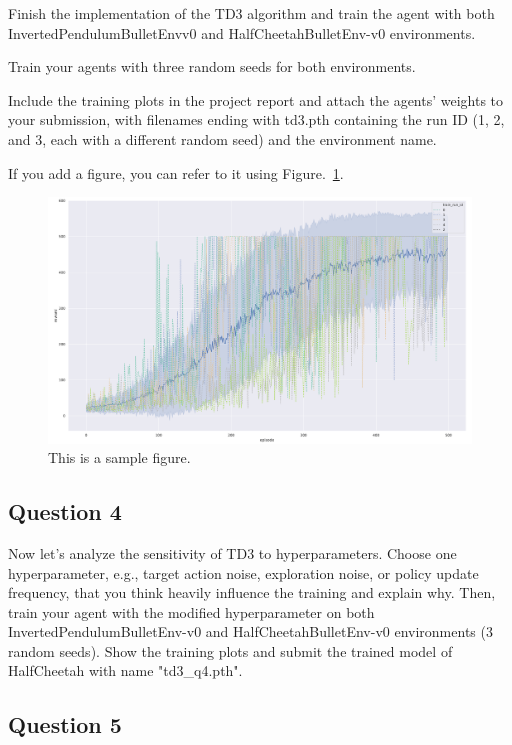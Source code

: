 \documentclass[12pt]{article}
\begin{document}
Finish the implementation of the TD3 algorithm and train the agent with both InvertedPendulumBulletEnvv0 and HalfCheetahBulletEnv-v0 environments.
\newline

\noindent
Train your agents with three random seeds for both environments. 
\newline

\noindent
Include the training plots in the project report and attach the agents’ weights to your submission, with filenames ending with td3.pth containing the run ID
(1, 2, and 3, each with a different random seed) and the environment name.
\newline

\noindent
If you add a figure, you can refer to it using Figure.~\ref*{fig:fig1}.

\begin{figure}[h] 
	\centering  %
    \includegraphics[width=0.9\columnwidth]{img/training.pdf}
	\caption{This is a sample figure.}
	\label{fig:fig1}
\end{figure}

\subsection*{Question 4}

Now let’s analyze the sensitivity of TD3 to hyperparameters. Choose one hyperparameter, e.g.,
target action noise, exploration noise, or policy update frequency, that you think heavily influence the training and explain why. Then, train your agent with the modified hyperparameter on both InvertedPendulumBulletEnv-v0 and HalfCheetahBulletEnv-v0 environments (3 random seeds).
Show the training plots and submit the trained model of HalfCheetah with name "td3\_q4.pth".

\subsection*{Question 5}
\end{document}

